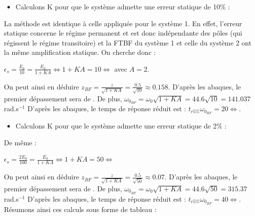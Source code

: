 \documentclass[12pt]{article}
\begin{document}
\begin{itemize}
    \item Calculons K pour que le système admette une erreur statique de 10$\%$ : 
\end{itemize}
La méthode est identique à celle appliquée pour le système 1. En effet, l'erreur statique concerne le régime permanent et est donc indépendante des pôles (qui régissent le régime transitoire) et la FTBF du système 1 et celle du système 2 ont la même amplification statique.
On cherche donc : 
\begin{center}
    $\epsilon_s = \frac{E_0}{10} = \frac{E_0}{1 + KA} \Leftrightarrow 1 + KA = 10 \Leftrightarrow$ avec $A = 2$.
\end{center}
On peut ainsi en déduire $z_{BF} = \frac{z}{\sqrt{1 + KA}} = \frac{0.5}{\sqrt{10}} \approx 0.158$. D'après les abaques, le premier dépassement sera de .
De plus, $\omega_{0_{BF}} = \omega_0\sqrt{1 + KA} = 44.6\sqrt{10} = 141.037$ rad.s$^{-1}$
D'après les abaques, le temps de réponse réduit est : $t_{r5\%}\omega_{0_{BF}} = 20 \Leftrightarrow $.

\begin{itemize}
    \item Calculons K pour que le système admette une erreur statique de 2$\%$ : 
\end{itemize}
De même : 
\begin{center}
    $\epsilon_s = \frac{2E_0}{100} = \frac{E_0}{1 + KA} \Leftrightarrow 1 + KA = 50 \Leftrightarrow$ 
\end{center}
On peut ainsi en déduire $z_{BF} = \frac{z}{\sqrt{1 + KA}} = \frac{0.5}{\sqrt{50}} \approx 0.07$. D'après les abaques, le premier dépassement sera de .
De plus, $\omega_{0_{BF}} = \omega_0\sqrt{1 + KA} = 44.6\sqrt{50} = 315.37$ rad.s$^{-1}$
D'après les abaques, le temps de réponse réduit est : $t_{r5\%}\omega_{0_{BF}} = 40 \Leftrightarrow $.
\newpage
\normalsize Résumons ainsi ces calculs sous forme de tableau : 
\end{document}
